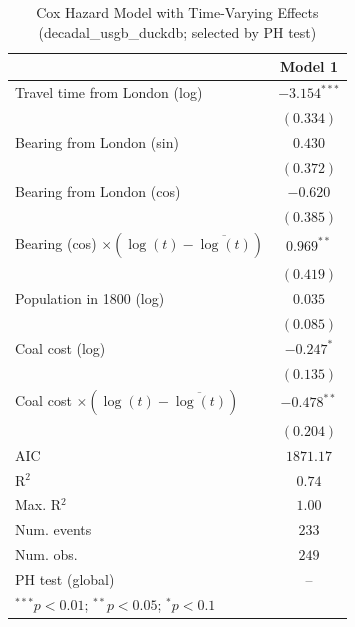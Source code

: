 
\begin{table}
\begin{center}
\begin{tabular}{l c}
\hline
 & Model 1 \\
\hline
Travel time from London (log) & $-3.154^{***}$ \\
 & $(0.334)$ \\
Bearing from London (sin) & $0.430$ \\
 & $(0.372)$ \\
Bearing from London (cos) & $-0.620$ \\
 & $(0.385)$ \\
Bearing (cos) $\times (\log(t)-\overline{\log(t)})$ & $0.969^{**}$ \\
 & $(0.419)$ \\
Population in 1800 (log) & $0.035$ \\
 & $(0.085)$ \\
Coal cost (log) & $-0.247^{*}$ \\
 & $(0.135)$ \\
Coal cost $\times (\log(t)-\overline{\log(t)})$ & $-0.478^{**}$ \\
 & $(0.204)$ \\
\hline
AIC              & $1871.17$ \\
R$^2$            & $0.74$ \\
Max. R$^2$       & $1.00$ \\
Num. events      & $233$ \\
Num. obs.        & $249$ \\
PH test (global) & -- \\
\hline
\multicolumn{2}{l}{\scriptsize{$^{***}p<0.01$; $^{**}p<0.05$; $^{*}p<0.1$}}
\end{tabular}
\caption{Cox Hazard Model with Time-Varying Effects (decadal\_usgb\_duckdb; selected by PH test)}
\label{tab:cox_serious_tv_decadal_usgb_duckdb}
\end{center}
\end{table}
